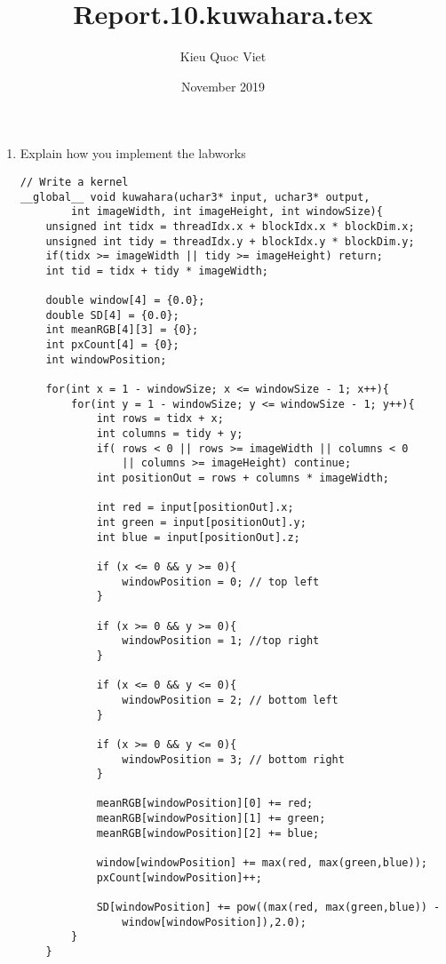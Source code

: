 \documentclass{article}
\title{Report.10.kuwahara.tex}
\author{Kieu Quoc Viet }
\date{November 2019}
\begin{document}
\maketitle

\begin{enumerate}
    \item Explain how you implement the labworks

    \begin{verbatim}
// Write a kernel
__global__ void kuwahara(uchar3* input, uchar3* output, 
        int imageWidth, int imageHeight, int windowSize){
    unsigned int tidx = threadIdx.x + blockIdx.x * blockDim.x;
    unsigned int tidy = threadIdx.y + blockIdx.y * blockDim.y;
    if(tidx >= imageWidth || tidy >= imageHeight) return;
    int tid = tidx + tidy * imageWidth;

    double window[4] = {0.0};
    double SD[4] = {0.0};
    int meanRGB[4][3] = {0};
    int pxCount[4] = {0};
    int windowPosition;

    for(int x = 1 - windowSize; x <= windowSize - 1; x++){
        for(int y = 1 - windowSize; y <= windowSize - 1; y++){
            int rows = tidx + x;
            int columns = tidy + y;
            if( rows < 0 || rows >= imageWidth || columns < 0 
                || columns >= imageHeight) continue;
            int positionOut = rows + columns * imageWidth;

            int red = input[positionOut].x;
            int green = input[positionOut].y;
            int blue = input[positionOut].z;

            if (x <= 0 && y >= 0){
                windowPosition = 0; // top left
            }

            if (x >= 0 && y >= 0){
                windowPosition = 1; //top right
            }

            if (x <= 0 && y <= 0){
                windowPosition = 2; // bottom left
            }

            if (x >= 0 && y <= 0){
                windowPosition = 3; // bottom right
            }

            meanRGB[windowPosition][0] += red;
            meanRGB[windowPosition][1] += green;
            meanRGB[windowPosition][2] += blue;

            window[windowPosition] += max(red, max(green,blue));
            pxCount[windowPosition]++;

            SD[windowPosition] += pow((max(red, max(green,blue)) -
                window[windowPosition]),2.0);
        }
    }


\end{verbatim}
\end{enumerate}
\end{document}
